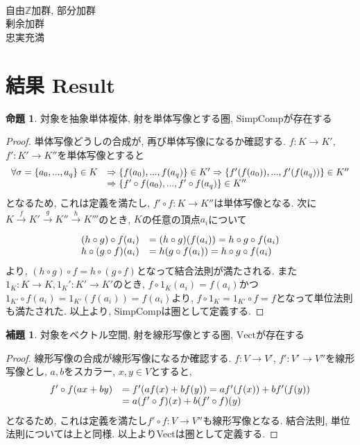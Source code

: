 \documentclass[a4paper]{jsarticle}
\theoremstyle{definition}
\newtheorem{prop}[dfn]{命題}
\newtheorem{lem}[dfn]{補題}
\newcommand{\SimpComp}{{\mathrm{SimpComp}}}
\newcommand{\Vect}{{\mathrm{Vect}}}
\begin{document}
\noindent\\

自由$\mathbb{Z}$加群, 部分加群\\
剰余加群\\
忠実充満\\

\section{結果 Result}
\begin{prop}
    対象を抽象単体複体, 射を単体写像とする圏, $\SimpComp$が存在する
\end{prop}
\begin{proof}
    単体写像どうしの合成が, 再び単体写像になるか確認する. $f:K\rightarrow K'$, $f':K'\rightarrow K''$を単体写像とすると
\begin{equation}
    \begin{array}{ll}
        \forall\sigma =\{a_0,...,a_q\}\in K & \Rightarrow \{f(a_0),...,f(a_q)\}\in K'\Rightarrow\{f'(f(a_0)),...,f'(f(a_q))\}\in K'' \\
         &  \Rightarrow\{f'\circ f(a_0),...,f'\circ f(a_q)\}\in K''\notag
    \end{array}
\end{equation}
となるため, これは定義を満たし, $f'\circ f:K\rightarrow K''$は単体写像となる. 次に$K\xrightarrow[]{f} K'\xrightarrow[]{g} K''\xrightarrow[]{h}K'''$のとき, $K$の任意の頂点$a_i$について
\begin{equation}
    \begin{array}{ll}
        (h\circ g)\circ f(a_i) & =(h\circ g)(f(a_i))=h\circ g\circ f(a_i) \\
        h\circ (g\circ f)(a_i) & =h(g\circ f(a_i))=h\circ g\circ f(a_i)\notag
    \end{array}
\end{equation}
より, $(h\circ g)\circ f=h\circ (g\circ f)$となって結合法則が満たされる. また$1_K:K\rightarrow K, 1_K':K'\rightarrow K'$のとき, $f\circ 1_K(a_i)=f(a_i)$かつ$1_{K'}\circ f(a_i)=1_{K'}(f(a_i))=f(a_i)$より, $f\circ 1_K=1_{K'}\circ f=f$となって単位法則も満たされた. 以上より, SimpCompは圏として定義する.
\end{proof}


\begin{lem}
    対象をベクトル空間, 射を線形写像とする圏, $\Vect$が存在する
\end{lem}
\begin{proof}
    線形写像の合成が線形写像になるか確認する. $f:V\rightarrow V'$, $f':V'\rightarrow V''$を線形写像とし, $a, b$をスカラー, $x, y\in V$とすると, 
\begin{equation}
    \begin{array}{ll}
        f'\circ f(ax+by) & =f'(af(x)+bf(y))=af'(f(x))+bf'(f(y)) \\
         & =a(f'\circ f)(x)+b(f'\circ f)(y)\notag
    \end{array}
\end{equation}
となるため, これは定義を満たし$f'\circ f:V\rightarrow V''$も線形写像となる. 結合法則, 単位法則については上と同様. 以上よりVectは圏として定義する.
\end{proof}
\end{document}
